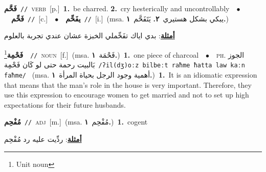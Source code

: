 \documentclass[10pt,a4paper,twoside]{article} %
\begin{document}
\begin{multicols}{2}
{\setlength\topsep{0pt}\textbf{\foreignlanguage{arabic}{فَحَّم}}\ {\color{gray}\texttt{//}\color{black}}\ \textsc{verb}\ [p.]\ \textbf{1.}~be charred.  \textbf{2.}~cry hesterically and uncontrollably\ \ $\bullet$\ \ \setlength\topsep{0pt}\textbf{\foreignlanguage{arabic}{فَحِّم}}\ {\color{gray}\texttt{//}\color{black}}\ [c.]\ \ $\bullet$\ \ \setlength\topsep{0pt}\textbf{\foreignlanguage{arabic}{يفَحِّم}}\ {\color{gray}\texttt{//}\color{black}}\ [i.]\ \color{gray}(msa. \foreignlanguage{arabic}{يبكي بشكل هستيري}~\foreignlanguage{arabic}{\textbf{٢.}}  \foreignlanguage{arabic}{يَتَفَحَّم}~\foreignlanguage{arabic}{\textbf{١.}})\color{black}\  \begin{flushright}\color{gray}\foreignlanguage{arabic}{\textbf{\underline{\foreignlanguage{arabic}{أمثلة}}}: بدي اياك تفَحِّملي الخبزة عشان عندي تجربة بالعلوم}\end{flushright}\color{black}} \vspace{2mm}

{\setlength\topsep{0pt}\textbf{\foreignlanguage{arabic}{فَحْمِة}}\footnote{Unit noun}\ \ {\color{gray}\texttt{//}\color{black}}\ \textsc{noun}\ [f.]\ \color{gray}(msa. \foreignlanguage{arabic}{فَحْمَة}~\foreignlanguage{arabic}{\textbf{١.}})\color{black}\ \textbf{1.}~one piece of charcoal\ \ $\bullet$\ \ \textsc{ph.} \color{gray} \foreignlanguage{arabic}{الجوز بَالبيت رحمة حتى لو كَان فَحْمِة}\color{black}\ {\color{gray}\texttt{/{\sffamily ʔil(dʒ)oːz bilbeːt raħme ħatta law kaːn faħme}/}\color{black}}\ \color{gray} (msa. \foreignlanguage{arabic}{أهمية وجود الرجل بحياة المرأة}~\foreignlanguage{arabic}{\textbf{١.}})\color{black}\ \textbf{1.}~It is an idiomatic expression that means that the man's role in the house is very important. Therefore, they use this expression to encourage women to get married and not to set up high expectations for their future husbands.\ } \vspace{2mm}

{\setlength\topsep{0pt}\textbf{\foreignlanguage{arabic}{مُفْحِم}}\ {\color{gray}\texttt{//}\color{black}}\ \textsc{adj}\ [m.]\ \color{gray}(msa. \foreignlanguage{arabic}{مُفْحِم}~\foreignlanguage{arabic}{\textbf{١.}})\color{black}\ \textbf{1.}~cogent\  \begin{flushright}\color{gray}\foreignlanguage{arabic}{\textbf{\underline{\foreignlanguage{arabic}{أمثلة}}}: ردِّيت عليه رد مُفْحِم}\end{flushright}\color{black}} \vspace{2mm}


\end{multicols}
\end{document}
